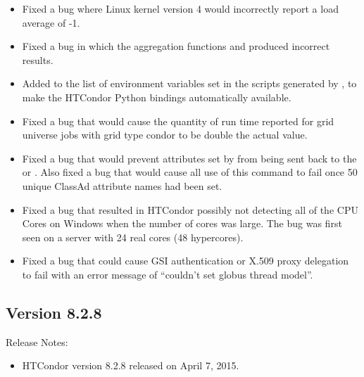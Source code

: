 \begin{itemize}

\item Fixed a bug where Linux kernel version 4 would incorrectly report
a load average of -1.

\item Fixed a bug in which the  aggregation functions 
 and  produced incorrect results.

\item Added  to the list of environment variables set in the
scripts generated by , to make the HTCondor Python
bindings automatically available.

\item Fixed a bug that would cause the quantity of run time reported for 
grid universe jobs with grid type condor to be double the actual value.

\item Fixed a bug that would prevent attributes set by  
from being sent back to the  or . Also fixed a bug that would
cause all use of this  command to fail once 50 unique ClassAd attribute names had been set.

\item Fixed a bug that resulted in HTCondor possibly not detecting all of the CPU Cores on Windows
when the number of cores was large. The bug was first seen on a server with 24 real cores (48 hypercores).

\item Fixed a bug that could cause GSI authentication or X.509 proxy
delegation to fail with an error message of
``couldn't set globus thread model''.

\end{itemize}

\subsection*{\label{sec:New-8-2-8}Version 8.2.8}

\noindent Release Notes:

\begin{itemize}

\item HTCondor version 8.2.8 released on April 7, 2015.

\end{itemize}


